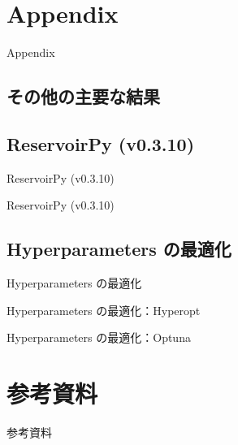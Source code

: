\section{Appendix}

\begin{frame}
    \begin{center}
        \LARGE Appendix
    \end{center}
\end{frame}

\subsection{その他の主要な結果}
\begin{frame}{}

\end{frame}

\begin{frame}{}

\end{frame}

\begin{frame}{}

\end{frame}

\begin{frame}{}

\end{frame}

\begin{frame}{}

\end{frame}

\subsection{ReservoirPy (v0.3.10)}
\begin{frame}{ReservoirPy (v0.3.10)}

\end{frame}

\begin{frame}{ReservoirPy (v0.3.10)}

\end{frame}

\subsection{Hyperparameters の最適化}
\begin{frame}{Hyperparameters の最適化}

\end{frame}

\begin{frame}{Hyperparameters の最適化：Hyperopt}

\end{frame}

\begin{frame}{Hyperparameters の最適化：Optuna}

\end{frame}

\section{参考資料}
\begin{frame}{参考資料}

\end{frame}

